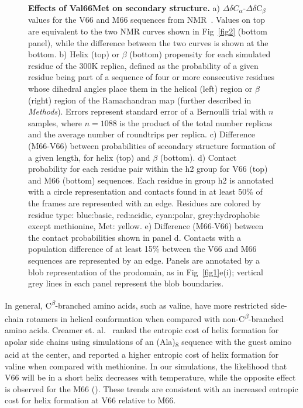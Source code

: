 \documentclass[10pt,letterpaper]{article}
\begin{document}
\begin{figure}[!ht]
\caption{{\bf Effects of Val66Met on secondary structure.} a) $\Delta$$\delta$$C_{\alpha}$-$\Delta$$\delta$C$_{\beta}$ values for the V66 and M66 sequences from NMR~\cite{Anastasia2013}. Values on top are equivalent to the two NMR curves shown in Fig~\ref{fig2} (bottom panel), while the difference between the two curves is shown at the bottom. b) Helix (top) or $\beta$ (bottom) propensity for each simulated residue of the 300K replica, defined as the probability of a given residue being part of a sequence of four or more consecutive residues whose dihedral angles place them in the helical (left) region or $\beta$ (right) region of the Ramachandran map (further described in {\it Methods}). Errors represent standard error of a Bernoulli trial with $n$ samples, where $n = 1088$ is the product of the total number replicas and the average number of roundtrips per replica. c) Difference (M66-V66) between probabilities of secondary structure formation of a given length, for helix (top) and $\beta$ (bottom). d) Contact probability for each residue pair within the h2 group for V66 (top) and M66 (bottom) sequences. Each residue in group h2 is annotated with a circle representation and contacts found in at least 50\% of the frames are represented with an edge. Residues are colored by residue type: blue:basic, red:acidic, cyan:polar, grey:hydrophobic except methionine, Met: yellow. e) Difference (M66-V66) between the contact probabilities shown in panel d. Contacts with a population difference of at least 15\% between the V66 and M66 sequences are represented by an edge. Panels are annotated by a blob representation of the prodomain, as in Fig~\ref{fig1}e(i); vertical grey lines in each panel represent the blob boundaries. }
\label{fig3} 
\end{figure}

In general, C\textsuperscript{$\beta$}-branched amino acids, such as valine, have more restricted side-chain rotamers in helical conformation when compared with non-C\textsuperscript{$\beta$}-branched amino acids. Creamer et. al.~\cite{Creamer1992} ranked the entropic cost of helix formation for apolar side chains using simulations of an (Ala)\textsubscript{8} sequence with the guest amino acid at the center, and reported a higher entropic cost of helix formation for valine when compared with methionine. In our simulations, the likelihood that V66 will be in a short helix decreases with temperature, while the opposite effect is observed for the M66 (). These trends are consistent with an increased entropic cost for helix formation at V66 relative to M66. 
\end{document}
